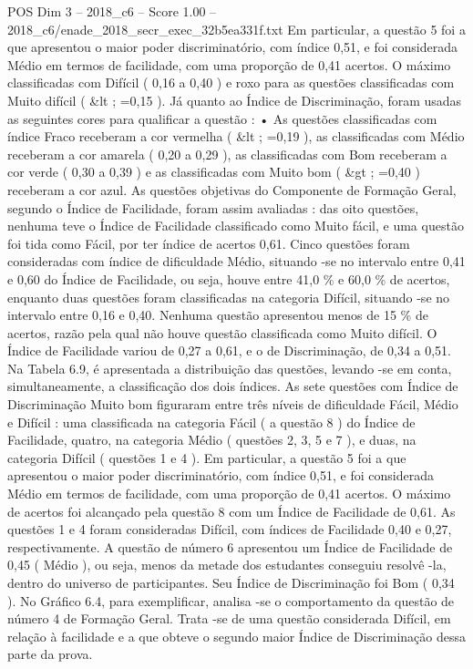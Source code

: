 \begin{textsample}{POS Dim 3 – 2018\_c6 – Score 1.00 – 2018\_c6/enade\_2018\_secr\_exec\_32b5ea331f.txt}
Em particular, a questão 5 foi a que apresentou o maior poder discriminatório, com índice 0,51, e foi considerada Médio em termos de facilidade, com uma proporção de 0,41 acertos.
O máximo classificadas com Difícil ( 0,16 a 0,40 ) e roxo para as questões classificadas com Muito difícil ( \&lt ; =0,15 ).
Já quanto ao Índice de Discriminação, foram usadas as seguintes cores para qualificar a questão : • As questões classificadas com índice Fraco receberam a cor vermelha ( \&lt ; =0,19 ), as classificadas com Médio receberam a cor amarela ( 0,20 a 0,29 ), as classificadas com Bom receberam a cor verde ( 0,30 a 0,39 ) e as classificadas com Muito bom ( \&gt ; =0,40 ) receberam a cor azul.
As questões objetivas do Componente de Formação Geral, segundo o Índice de Facilidade, foram assim avaliadas : das oito questões, nenhuma teve o Índice de Facilidade classificado como Muito fácil, e uma questão foi tida como Fácil, por ter índice de acertos 0,61.
Cinco questões foram consideradas com índice de dificuldade Médio, situando -se no intervalo entre 0,41 e 0,60 do Índice de Facilidade, ou seja, houve entre 41,0 \% e 60,0 \% de acertos, enquanto duas questões foram classificadas na categoria Difícil, situando -se no intervalo entre 0,16 e 0,40.
Nenhuma questão apresentou menos de 15 \% de acertos, razão pela qual não houve questão classificada como Muito difícil.
O Índice de Facilidade variou de 0,27 a 0,61, e o de Discriminação, de 0,34 a 0,51.
Na Tabela 6.9, é apresentada a distribuição das questões, levando -se em conta, simultaneamente, a classificação dos dois índices.
As sete questões com Índice de Discriminação Muito bom figuraram entre três níveis de dificuldade Fácil, Médio e Difícil : uma classificada na categoria Fácil ( a questão 8 ) do Índice de Facilidade, quatro, na categoria Médio ( questões 2, 3, 5 e 7 ), e duas, na categoria Difícil ( questões 1 e 4 ).
Em particular, a questão 5 foi a que apresentou o maior poder discriminatório, com índice 0,51, e foi considerada Médio em termos de facilidade, com uma proporção de 0,41 acertos.
O máximo de acertos foi alcançado pela questão 8 com um Índice de Facilidade de 0,61.
As questões 1 e 4 foram consideradas Difícil, com índices de Facilidade 0,40 e 0,27, respectivamente.
A questão de número 6 apresentou um Índice de Facilidade de 0,45 ( Médio ), ou seja, menos da metade dos estudantes conseguiu resolvê -la, dentro do universo de participantes.
Seu Índice de Discriminação foi Bom ( 0,34 ).
No Gráfico 6.4, para exemplificar, analisa -se o comportamento da questão de número 4 de Formação Geral.
Trata -se de uma questão considerada Difícil, em relação à facilidade e a que obteve o segundo maior Índice de Discriminação dessa parte da prova.

\end{textsample}
